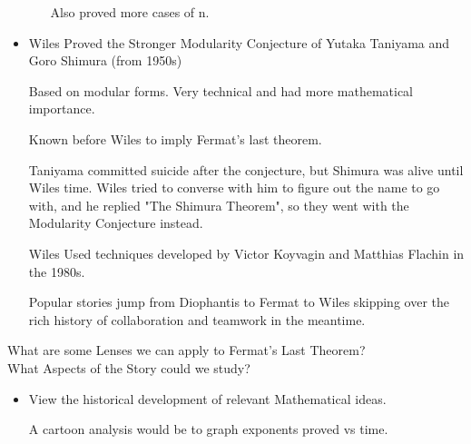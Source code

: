 \documentclass{report}
\begin{document}
\begin{description}
\begin{itemize}
\begin{itemize}
\begin{mdframed}
                            \vspace{10pt}

                            Also proved more cases of n.
                        \end{mdframed}
                \end{itemize}
            \item Wiles Proved the Stronger Modularity Conjecture
                of Yutaka Taniyama and Goro Shimura (from 1950s)
                \begin{mdframed}
                    Based on modular forms. Very technical and had
                    more mathematical importance.
                \end{mdframed}
                \begin{mdframed}
                    Known before Wiles to imply Fermat's last theorem.
                \end{mdframed}
                \begin{mdframed}
                    Taniyama committed suicide after the conjecture,
                    but Shimura was alive until Wiles time. Wiles
                    tried to converse with him to figure out the
                    name to go with, and he replied "The Shimura Theorem",
                    so they went with the Modularity Conjecture instead.
                \end{mdframed}
                \begin{mdframed}
                    Wiles Used techniques developed by 
                    Victor Koyvagin and Matthias Flachin in the
                    1980s.
                \end{mdframed}
                \begin{mdframed}
                    Popular stories jump from Diophantis to Fermat
                    to Wiles skipping over the rich history of
                    collaboration and teamwork in the meantime.
                \end{mdframed}
        \end{itemize}
    \item What are some Lenses we can apply to Fermat's
        Last Theorem?\\
        What Aspects of the Story could we study?
        \begin{itemize}
            \item View the historical development of
                relevant Mathematical ideas.
                \begin{mdframed}
                    A cartoon analysis would be to graph
                    exponents proved vs time.


\end{mdframed}
\end{itemize}
\end{description}
\end{document}
